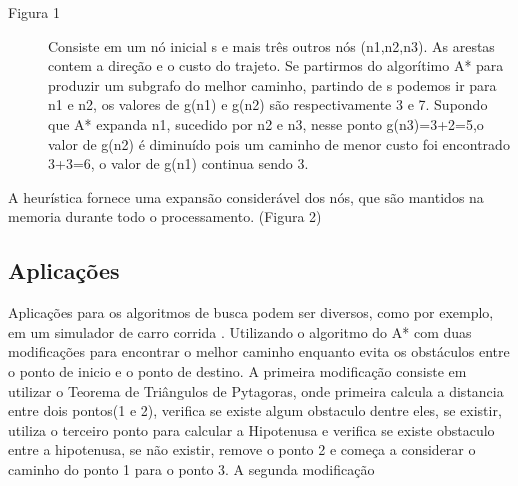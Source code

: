 \begin{description}
    \item[Figura 1] Consiste em um nó inicial s e mais três outros nós (n1,n2,n3). As arestas contem a direção e o custo do trajeto. Se partirmos do algorítimo A* para produzir um subgrafo do melhor caminho, partindo de s podemos ir para n1 e n2, os valores de g(n1) e g(n2) são respectivamente 3 e 7. Supondo que A* expanda n1, sucedido por n2 e n3, nesse ponto g(n3)=3+2=5,o valor de g(n2) é diminuído pois um caminho de menor custo foi encontrado  3+3=6, o valor de g(n1) continua sendo 3. 
    
\end{description}

A heurística fornece uma expansão considerável dos nós, que são mantidos na memoria durante todo o processamento. (Figura 2)




\begin{minipage}{\linewidth}
\end{minipage}

\subsection{Aplicações}
Aplicações para os algoritmos de busca podem ser diversos, como por exemplo, em um simulador de carro corrida \cite{JungTing}. Utilizando o algoritmo do A* com duas modificações para encontrar o melhor caminho enquanto evita os obstáculos entre o ponto de inicio e o ponto de destino. 
A primeira modificação consiste em utilizar o Teorema de Triângulos de Pytagoras, onde primeira calcula a distancia entre dois pontos(1 e 2), verifica se existe algum obstaculo dentre eles, se existir, utiliza o terceiro ponto para calcular a Hipotenusa e verifica se existe obstaculo entre a hipotenusa, se não existir, remove o ponto 2 e começa a considerar o caminho do ponto 1 para o ponto 3. A segunda modificação

